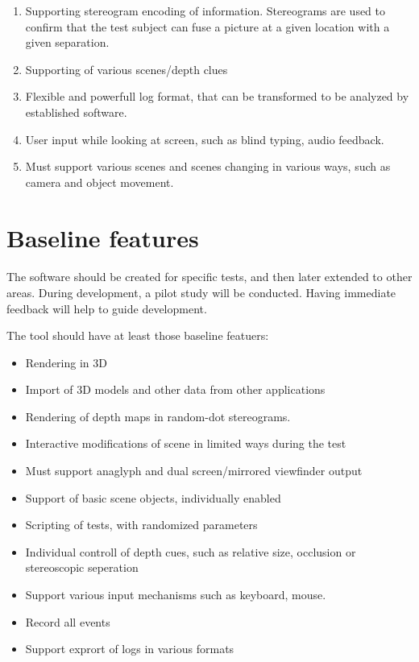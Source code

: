 \documentclass[11pt]{scrartcl}
\begin{document}
\begin{multicols}{2}
\begin{enumerate}
\item Supporting stereogram encoding of information. Stereograms are used to confirm that the test subject can fuse a picture at a given location with a given separation.
\item Supporting of various scenes/depth clues
\item Flexible and powerfull log format, that can be transformed to be analyzed by established software.
\item User input while looking at screen, such as blind typing, audio feedback.
\item Must support various scenes and scenes changing in various ways, such as camera and object movement.
\end{enumerate}

\section{Baseline features}
\paragraph{}
The software should be created for specific tests, and then later extended to other areas. During development, a pilot study will be conducted. Having immediate feedback will help to guide development.

The tool should have at least those baseline featuers:

\begin{itemize}
\item Rendering in 3D
\item Import of 3D models and other data from other applications
\item Rendering of depth maps in random-dot stereograms.
\item Interactive modifications of scene in limited ways during the test
\item Must support anaglyph and dual screen/mirrored viewfinder output
\item Support of basic scene objects, individually enabled
\item Scripting of tests, with randomized parameters
\item Individual controll of depth cues, such as relative size, occlusion or stereoscopic seperation
\item Support various input mechanisms such as keyboard, mouse.
\item Record all events
\item Support exprort of logs in various formats
\end{itemize}


\end{multicols}
\end{document}
